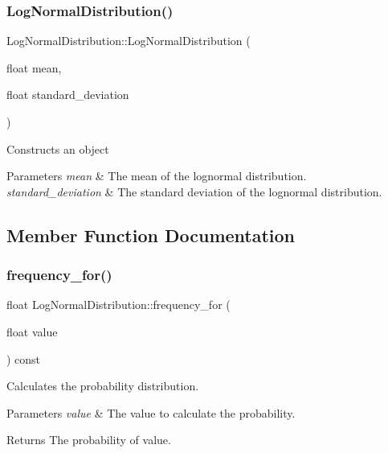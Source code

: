 \subsubsection{\texorpdfstring{Log\+Normal\+Distribution()}{LogNormalDistribution()}}
{\footnotesize\ttfamily Log\+Normal\+Distribution\+::\+Log\+Normal\+Distribution (\begin{DoxyParamCaption}\item[{float}]{mean,  }\item[{float}]{standard\+\_\+deviation }\end{DoxyParamCaption})\hspace{0.3cm}{\ttfamily [inline]}}

Constructs an object 
\begin{DoxyParams}{Parameters}
{\em mean} & The mean of the lognormal distribution. \\
\hline
{\em standard\+\_\+deviation} & The standard deviation of the lognormal distribution. \\
\hline
\end{DoxyParams}


\subsection{Member Function Documentation}
\mbox{\label{classLogNormalDistribution_ab60a8974eaed392159b794994ed20999}} 
\subsubsection{\texorpdfstring{frequency\+\_\+for()}{frequency\_for()}}
{\footnotesize\ttfamily float Log\+Normal\+Distribution\+::frequency\+\_\+for (\begin{DoxyParamCaption}\item[{float}]{value }\end{DoxyParamCaption}) const\hspace{0.3cm}{\ttfamily [virtual]}}

Calculates the probability distribution. 
\begin{DoxyParams}{Parameters}
{\em value} & The value to calculate the probability. \\
\hline
\end{DoxyParams}
\begin{DoxyReturn}{Returns}
The probability of value. 
\end{DoxyReturn}


